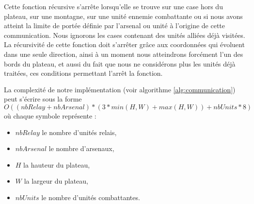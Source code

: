 \documentclass[a4paper]{report}
\begin{document}
Cette fonction récursive s'arrête lorsqu'elle se trouve sur une case hors du plateau, sur une montagne, sur une unité ennemie combattante ou si nous avons atteint la limite de portée définie par l'arsenal ou unité à l'origine de cette communication. Nous ignorons les cases contenant des unités alliées déjà visitées. La récursivité de cette fonction doit s'arrêter grâce aux coordonnées qui évoluent dans une seule direction, ainsi à un moment nous atteindrons forcément l'un des bords du plateau, et aussi du fait que nous ne considérons plus les unités déjà traitées, ces conditions permettant l'arrêt la fonction.

\newpage
La complexité de notre implémentation (voir algorithme \ref{alg:communication}) peut s'écrire sous la forme 
$$
O((nbRelay + nbArsenal) * (3 * min(H, W) + max(H, W)) + nbUnits * 8)
$$
où chaque symbole représente :
\begin{itemize}
\item $nbRelay$ le nombre d'unités relais,
\item $nbArsenal$ le nombre d'arsenaux,
\item $H$ la hauteur du plateau,
\item $W$ la largeur du plateau,
\item $nbUnits$ le nombre d'unités combattantes.
\end{itemize}

\end{document}
